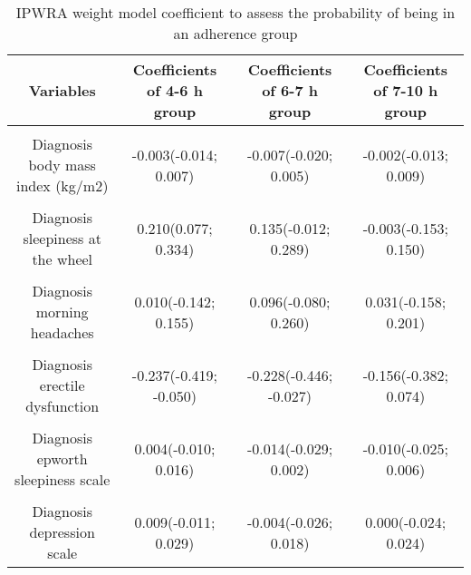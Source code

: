 \documentclass{article}
\begin{document}
\begin{table}[H]

\caption{\label{tab:Wheight_coefficients}IPWRA weight model coefficient to assess the probability of being in an adherence group}
\centering
\fontsize{7}{9}\selectfont
\begin{tabular}[t]{cccc}
\toprule
Variables & Coefficients of 4-6 h group & Coefficients of 6-7 h group & Coefficients of 7-10 h group\\
\midrule
\cellcolor{gray!6}{Diagnosis age (years)} & \cellcolor{gray!6}{0.011(0.006; 0.016)} & \cellcolor{gray!6}{0.022(0.017; 0.028)} & \cellcolor{gray!6}{0.029(0.023; 0.035)}\\
Diagnosis body mass index (kg/m2) & -0.003(-0.014; 0.007) & -0.007(-0.020; 0.005) & -0.002(-0.013; 0.009)\\
\cellcolor{gray!6}{Diagnosis neck circumference} & \cellcolor{gray!6}{0.003(-0.014; 0.021)} & \cellcolor{gray!6}{0.024(0.005; 0.044)} & \cellcolor{gray!6}{0.027(0.008; 0.048)}\\
Diagnosis sleepiness at the wheel & 0.210(0.077; 0.334) & 0.135(-0.012; 0.289) & -0.003(-0.153; 0.150)\\
\cellcolor{gray!6}{Diagnosis morning tiredness} & \cellcolor{gray!6}{0.049(-0.101; 0.202)} & \cellcolor{gray!6}{0.010(-0.160; 0.174)} & \cellcolor{gray!6}{0.119(-0.062; 0.297)}\\
Diagnosis morning headaches & 0.010(-0.142; 0.155) & 0.096(-0.080; 0.260) & 0.031(-0.158; 0.201)\\
\cellcolor{gray!6}{Diagnosis libido disorder} & \cellcolor{gray!6}{-0.013(-0.179; 0.152)} & \cellcolor{gray!6}{0.129(-0.061; 0.316)} & \cellcolor{gray!6}{-0.014(-0.221; 0.180)}\\
Diagnosis erectile dysfunction & -0.237(-0.419; -0.050) & -0.228(-0.446; -0.027) & -0.156(-0.382; 0.074)\\
\cellcolor{gray!6}{Diagnosis night sweating} & \cellcolor{gray!6}{-0.025(-0.154; 0.105)} & \cellcolor{gray!6}{-0.011(-0.170; 0.163)} & \cellcolor{gray!6}{0.024(-0.142; 0.192)}\\
Diagnosis epworth sleepiness scale & 0.004(-0.010; 0.016) & -0.014(-0.029; 0.002) & -0.010(-0.025; 0.006)\\
\cellcolor{gray!6}{Diagnosis pichot's fatigue scale} & \cellcolor{gray!6}{0.006(-0.005; 0.017)} & \cellcolor{gray!6}{0.027(0.015; 0.040)} & \cellcolor{gray!6}{0.025(0.012; 0.038)}\\
Diagnosis depression scale & 0.009(-0.011; 0.029) & -0.004(-0.026; 0.018) & 0.000(-0.024; 0.024)\\

\end{tabular}
\end{table}
\end{document}
